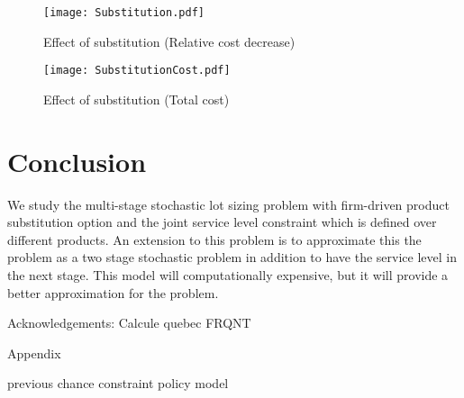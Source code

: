 \documentclass[10pt]{article}
\begin{document}

\begin{figure}[!h]
\begin{center}
\texttt{[image: Substitution.pdf]}
\caption{Effect of substitution (Relative cost decrease)} 
\label{fig:sustitution}
\end{center}
\end{figure}


\begin{figure}[!h]
\begin{center}
\texttt{[image: SubstitutionCost.pdf]}
\caption{Effect of substitution (Total cost)} 
\label{fig:sustitution}
\end{center}
\end{figure}


\section{Conclusion}

We study the multi-stage stochastic lot sizing problem with firm-driven product substitution option and the joint service level constraint which is defined over different products. 
An extension to this problem is to approximate this the problem as a two stage stochastic problem in addition to have the service level in the next stage. This model will computationally expensive, but it will provide a better approximation for the problem.

Acknowledgements:
Calcule quebec
FRQNT


Appendix 

previous chance constraint policy model
\end{document}
